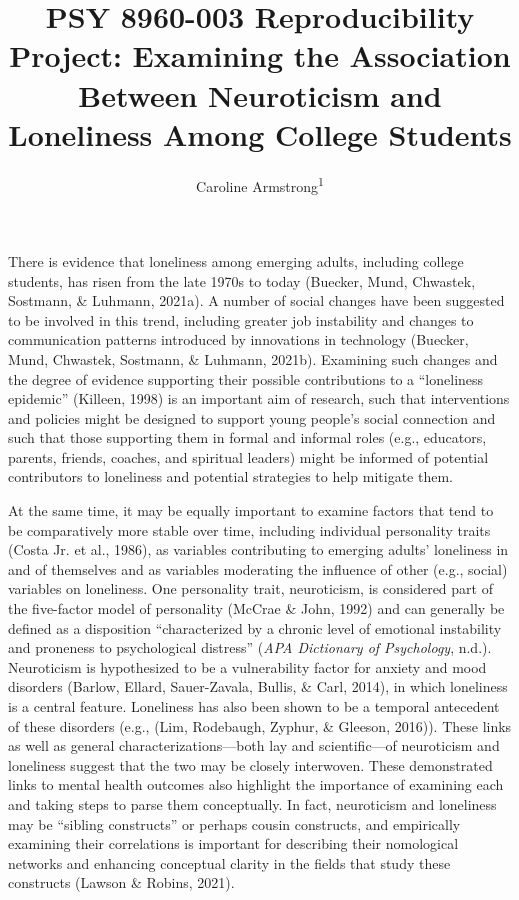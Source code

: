 \documentclass[
  english,
  man]{apa6}
\title{PSY 8960-003 Reproducibility Project: Examining the Association Between Neuroticism and Loneliness Among College Students}
\author{Caroline Armstrong\textsuperscript{1}}
\date{}
\affiliation{\vspace{0.5cm}\textsuperscript{1} Department of Psychology, University of Minnesota}
\begin{document}
\maketitle

There is evidence that loneliness among emerging adults, including college students, has risen from the late 1970s to today (Buecker, Mund, Chwastek, Sostmann, \& Luhmann, 2021a). A number of social changes have been suggested to be involved in this trend, including greater job instability and changes to communication patterns introduced by innovations in technology (Buecker, Mund, Chwastek, Sostmann, \& Luhmann, 2021b). Examining such changes and the degree of evidence supporting their possible contributions to a ``loneliness epidemic'' (Killeen, 1998) is an important aim of research, such that interventions and policies might be designed to support young people's social connection and such that those supporting them in formal and informal roles (e.g., educators, parents, friends, coaches, and spiritual leaders) might be informed of potential contributors to loneliness and potential strategies to help mitigate them.

At the same time, it may be equally important to examine factors that tend to be comparatively more stable over time, including individual personality traits (Costa Jr. et al., 1986), as variables contributing to emerging adults' loneliness in and of themselves and as variables moderating the influence of other (e.g., social) variables on loneliness. One personality trait, neuroticism, is considered part of the five-factor model of personality (McCrae \& John, 1992) and can generally be defined as a disposition ``characterized by a chronic level of emotional instability and proneness to psychological distress'' (\emph{APA Dictionary of Psychology}, n.d.). Neuroticism is hypothesized to be a vulnerability factor for anxiety and mood disorders (Barlow, Ellard, Sauer-Zavala, Bullis, \& Carl, 2014), in which loneliness is a central feature. Loneliness has also been shown to be a temporal antecedent of these disorders (e.g., (Lim, Rodebaugh, Zyphur, \& Gleeson, 2016)). These links as well as general characterizations---both lay and scientific---of neuroticism and loneliness suggest that the two may be closely interwoven. These demonstrated links to mental health outcomes also highlight the importance of examining each and taking steps to parse them conceptually. In fact, neuroticism and loneliness may be ``sibling constructs'' or perhaps cousin constructs, and empirically examining their correlations is important for describing their nomological networks and enhancing conceptual clarity in the fields that study these constructs (Lawson \& Robins, 2021).
\end{document}
